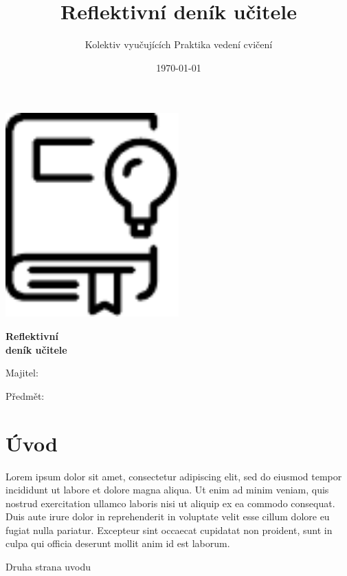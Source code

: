 \documentclass[twoside,openany,10pt]{book}
\title{Reflektivní deník učitele}
\author{Kolektiv vyučujících Praktika vedení cvičení}
\date{\today}
\begin{document}
\begin{titlepage}
	\centering
    \vspace*{1cm}
	\includegraphics[width=0.5\textwidth]{dennik}\par
	\vspace{0.5cm}
	{\huge\bfseries Reflektivní\\ deník učitele\par}
	\vfill
	\raggedright
    \Large
	Majitel:\par
    \vspace{0.2cm}
    Předmět:\par
\end{titlepage}


\chapter*{Úvod}

Lorem ipsum dolor sit amet, consectetur adipiscing elit, sed do eiusmod tempor incididunt ut labore et dolore magna aliqua. Ut enim ad minim veniam, quis nostrud exercitation ullamco laboris nisi ut aliquip ex ea commodo consequat. Duis aute irure dolor in reprehenderit in voluptate velit esse cillum dolore eu fugiat nulla pariatur. Excepteur sint occaecat cupidatat non proident, sunt in culpa qui officia deserunt mollit anim id est laborum.

\newpage
Druha strana uvodu



\chapter{}
\vspace*{-2em}
\end{document}
